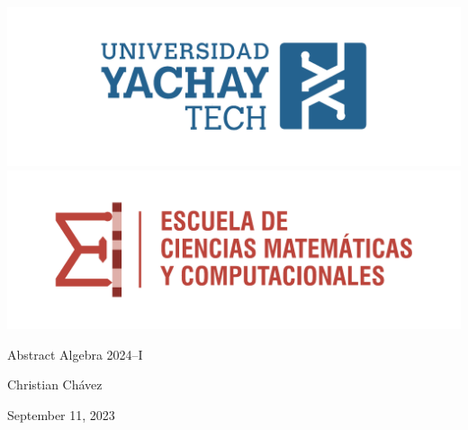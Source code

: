 \pagebreak

\begin{center}
    \includegraphics[height=0.075\textheight]{images/LogoYachay.pdf} 
    \hspace{0.1\linewidth}
    \includegraphics[height=0.075\textheight]{images/LogoECMC.pdf}
\end{center}


\begin{center}
    {\LARGE
    Abstract Algebra 2024--I\\
    \vspace{0.25cm}
    \textbf{\thetitle{}}}

    
    Christian Chávez
    

    September 11, 2023
\end{center}

